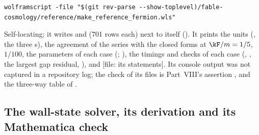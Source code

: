 \begin{Verbatim}
wolframscript -file "$(git rev-parse --show-toplevel)/fable-cosmology/reference/make_reference_fermion.wls"
\end{Verbatim}
Self-locating; it writes  and  (701
rows each) next to itself (). It prints the units
(, the three s), the agreement of the series
with the closed forms at $\kF/m=1/5$, $1/100$, the parameters of each case
(;
), the timings and
checks of each case (, , the largest gap residual, ), and
 [file: its
 statements]. Its console output was not captured in a repository log; the check of its files
is Part~VIII's assertion , and the three-way table of
.

\subsection{The wall-state solver, its derivation and its Mathematica check}
\label{sec:11.7}

